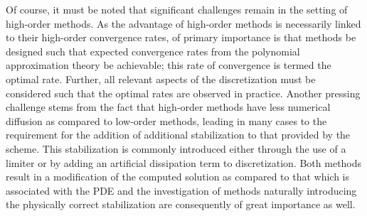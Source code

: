 Of course, it must be noted that significant challenges remain in the setting of
high-order methods.
As the advantage of high-order methods is necessarily linked to their
high-order convergence rates, of primary importance is that methods be
designed such that expected convergence rates from the polynomial approximation
theory be achievable; this rate of convergence is termed the optimal rate.
Further, all relevant aspects of the discretization must be
considered such that the optimal rates are observed in practice.
Another pressing challenge stems from the fact that high-order methods have less
numerical diffusion as compared to low-order methods, leading in many cases to
the requirement for the addition of additional stabilization to that
provided by the scheme.
This stabilization is commonly introduced either through
the use of a limiter or by adding an artificial dissipation term to
discretization.
Both methods result in a modification of the computed solution
as compared to that which is associated with the PDE and the investigation of
methods naturally introducing the physically correct stabilization are
consequently of great importance as well.
